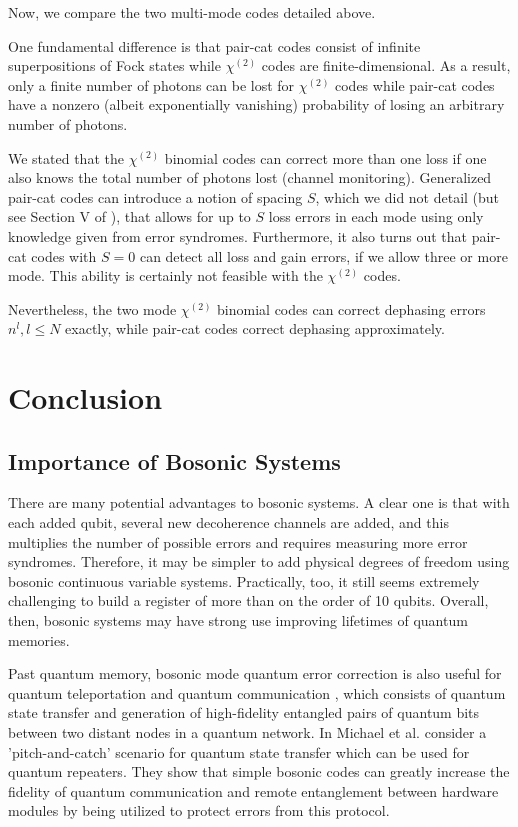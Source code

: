 \documentclass[12]{amsart}
\newcommand\0{\mathbf{0}}
\newcommand\<{\langle}
\renewcommand\>{\rangle}
\begin{document}
Now, we compare the two multi-mode codes detailed above.

One fundamental difference is that pair-cat codes consist of infinite superpositions of Fock states while $\chi^{(2)}$ codes are finite-dimensional. As a result, only a finite number of photons can be lost for $\chi^{(2)}$ codes while pair-cat codes have a nonzero (albeit exponentially vanishing) probability of losing an arbitrary number of photons. 

We stated that the $\chi^{(2)}$ binomial codes can correct more than one loss if one also knows the total number of photons lost (channel monitoring). Generalized pair-cat codes can introduce a notion of spacing $S$, which we did not detail (but see Section V of \cite{albert2018multimode}), that allows for up to $S$ loss errors in each mode using only knowledge given from error syndromes. Furthermore, it also turns out that pair-cat codes with $S=0$ can detect all loss and gain errors, if we allow three or more mode\cite{albert2018multimode}. This ability is certainly not feasible with the $\chi^{(2)}$ codes.

Nevertheless, the two mode $\chi^{(2)}$ binomial codes can correct dephasing errors $n^l, l \leq N$ exactly, while pair-cat codes correct dephasing approximately.

\section{Conclusion}

\subsection{Importance of Bosonic Systems}

There are many potential advantages to bosonic systems. A clear one is that with each added qubit, several new decoherence channels are added, and this multiplies the number of possible errors and requires measuring more error syndromes. Therefore, it may be simpler to add physical degrees of freedom using bosonic continuous variable systems. Practically, too, it still seems extremely challenging to build a register of more than on the order of 10 qubits. Overall, then, bosonic systems may have strong use improving lifetimes of quantum memories.

Past quantum memory, bosonic mode quantum error correction is also useful for quantum teleportation and quantum communication \cite{michael2016new}, which consists of quantum state transfer and generation of high-fidelity entangled pairs of quantum bits between two distant nodes in a quantum network. In \cite{michael2016new} Michael et al. consider a 'pitch-and-catch' scenario for quantum state transfer which can be used for quantum repeaters. They show that simple bosonic codes can greatly increase the fidelity of quantum communication and remote entanglement between hardware modules by being utilized to protect errors from this protocol.
\end{document}
